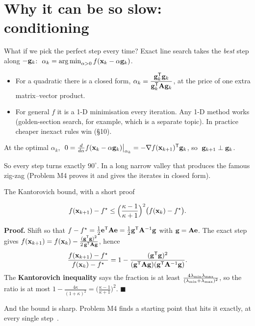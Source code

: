 \section{Why it can be so slow: conditioning}

\begin{frame}{What if we pick the perfect step every time?}
  Exact line search takes the \emph{best} step along $-\mathbf{g}_k$: $\;\alpha_k = \operatorname*{arg\,min}_{\alpha>0}f(\mathbf{x}_k-\alpha\mathbf{g}_k)$.
  \begin{itemize}\small
    \item For a quadratic there is a closed form, $\alpha_k = \dfrac{\mathbf{g}_k^{\mathsf T}\mathbf{g}_k}{\mathbf{g}_k^{\mathsf T}\mathbf{A}\mathbf{g}_k}$, at the price of one extra matrix--vector product.
    \item For general $f$ it is a 1-D minimisation every iteration. Any 1-D method works (golden-section search, for example,
          which is a separate topic). In practice cheaper inexact rules win (\S10).
  \end{itemize}
  \begin{thmbox}
    At the optimal $\alpha_k$,
    $\;0 = \tfrac{d}{d\alpha}f(\mathbf{x}_k-\alpha\mathbf{g}_k)\big|_{\alpha_k} = -\nabla f(\mathbf{x}_{k+1})^{\mathsf T}\mathbf{g}_k$, so $\;\mathbf{g}_{k+1}\perp\mathbf{g}_k$.
  \end{thmbox}
  \small So every step turns exactly $90^\circ$. In a long narrow valley that produces the famous
  \alert{zig-zag} (Problem M4 proves it and gives the iterates in closed form).
\end{frame}

\begin{frame}{The Kantorovich bound, with a short proof}
  \begin{thmbox}
    \[ f(\mathbf{x}_{k+1})-f^\star \le \Bigl(\frac{\kappa-1}{\kappa+1}\Bigr)^2\bigl(f(\mathbf{x}_k)-f^\star\bigr). \]
  \end{thmbox}
  \small\textbf{Proof.}
  \pause
  Shift so that $f - f^\star = \tfrac12\mathbf{e}^{\mathsf T}\mathbf{A}\mathbf{e} = \tfrac12\mathbf{g}^{\mathsf T}\mathbf{A}^{-1}\mathbf{g}$ with $\mathbf{g} = \mathbf{A}\mathbf{e}$. The exact step gives
  $f(\mathbf{x}_{k+1}) = f(\mathbf{x}_k) - \frac{(\mathbf{g}^{\mathsf T}\mathbf{g})^2}{2\,\mathbf{g}^{\mathsf T}\mathbf{A}\mathbf{g}}$, hence
  \[
    \frac{f(\mathbf{x}_{k+1})-f^\star}{f(\mathbf{x}_k)-f^\star} = 1-\frac{(\mathbf{g}^{\mathsf T}\mathbf{g})^2}{(\mathbf{g}^{\mathsf T}\mathbf{A}\mathbf{g})(\mathbf{g}^{\mathsf T}\mathbf{A}^{-1}\mathbf{g})} .
  \]
  \pause
  The \textbf{Kantorovich inequality} says the fraction is at least $\frac{4\lambda_{\min}\lambda_{\max}}{(\lambda_{\min}+\lambda_{\max})^2}$, so the ratio is at most
  $1-\frac{4\kappa}{(1+\kappa)^2} = \bigl(\frac{\kappa-1}{\kappa+1}\bigr)^2$. $\blacksquare$
  \pause

  \vspace{2pt}
  \footnotesize And the bound is \alert{sharp}. Problem M4 finds a starting point that hits it exactly, at every single step~\cite{nocedal2006,boyd2004}.
\end{frame}

